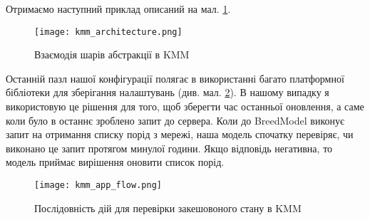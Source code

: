 Отримаємо наступний приклад описаний на мал. \ref{fig:kmm_architecture}.

\begin{figure}[h]
    \begin{center}
        \texttt{[image: kmm\_architecture.png]}
    \end{center}
    \caption{Взаємодія шарів абстракції в KMM}
    \label{fig:kmm_architecture}
\end{figure}
\FloatBarrier

Останній пазл нашої конфігурації полягає в використанні багато платформної бібліотеки для зберігання налаштувань (див. мал. \ref{fig:kmm_app_flow}).
В нашому випадку я використовую це рішення для того, щоб зберегти час останньої оновлення, а саме коли було в останнє зроблено запит до сервера.
Коли до BreedModel виконує запит на отримання списку порід з мережі, наша модель спочатку перевіряє, чи виконано це запит протягом минулої години.
Якщо відповідь негативна, то модель приймає вирішення оновити список порід.

\FloatBarrier
\begin{figure}[h]
    \begin{center}
        \texttt{[image: kmm\_app\_flow.png]}
    \end{center}
    \caption{Послідовність дій для перевірки закешовоного стану в KMM}
    \label{fig:kmm_app_flow}
\end{figure}
